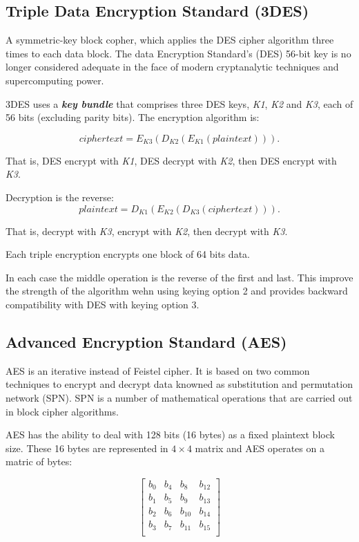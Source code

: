 \documentclass[11pt]{article}
\begin{document}
\subsection{Triple Data Encryption Standard (3DES)}

A symmetric-key block copher, which applies the DES cipher algorithm three times to each data block. The data Encryption Standard's (DES) 56-bit key is no longer considered adequate in the face of modern cryptanalytic techniques and supercomputing power.
	
3DES uses a \textbf{\textit{key bundle}} that comprises three DES keys, \textit{K1}, \textit{K2} and \textit{K3}, each of 56 bits (excluding parity bits). The encryption algorithm is:	

$$
ciphertext = E_{K3}(D_{K2}(E_{K1}(plaintext))).
$$

That is, DES encrypt with \textit{K1}, DES decrypt with \textit{K2}, then DES encrypt with \textit{K3}.
	
Decryption is the reverse:
$$
plaintext = D_{K1}(E_{K2}(D_{K3}(ciphertext))).
$$

That is, decrypt with \textit{K3}, encrypt with \textit{K2}, then decrypt with \textit{K3}.
	
Each triple encryption encrypts one block of 64 bits data.

In each case the middle operation is the reverse of the first and last. This improve the strength of the algorithm wehn using keying option 2 and provides backward compatibility with DES with keying option 3.

\subsection{Advanced Encryption Standard (AES)}

AES\citep{AES} is an iterative instead of Feistel cipher. It is based on two common techniques to encrypt and decrypt data knowned as substitution and permutation network (SPN). SPN is a number of mathematical operations that are carried out in block cipher algorithms.

AES has the ability to deal with 128 bits (16 bytes) as a fixed plaintext block size. These 16 bytes are represented in $4\times4$ matrix and AES operates on a matric of bytes:

$$
\left[
\begin{matrix}
b_0 & b_4 & b_8 & b_{12} \\
b_1 & b_5 & b_9 & b_{13} \\
b_2 & b_6 & b_10 & b_{14} \\
b_3 & b_7 & b_11 & b_{15} \\
\end{matrix}
\right]
$$
\end{document}
